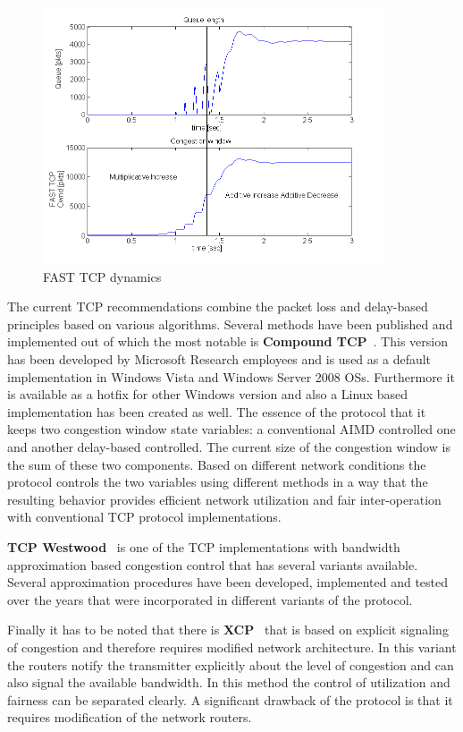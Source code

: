 \documentclass[a4paper]{article}
\begin{document}
\begin{figure}[H]
    \centering
    \includegraphics[width=0.9\textwidth]{figures/FAST.png}
    \caption{FAST TCP dynamics}
    \label{fig:FastTCP}
\end{figure}

The current TCP recommendations combine the packet loss and delay-based principles based on various algorithms. Several methods have been published and implemented out of which the most notable is \textbf{Compound TCP}~\cite{CompundTCP}. This version has been developed by Microsoft Research employees and is used as a default implementation in Windows Vista and Windows Server 2008 OSs. Furthermore it is available as a hotfix for other Windows version and also a Linux based implementation has been created as well. The essence of the protocol that it keeps two congestion window state variables: a conventional AIMD controlled one and another delay-based controlled. The current size of the congestion window is the sum of these two components. Based on different network conditions the protocol controls the two variables using different methods in a way that the resulting behavior provides efficient network utilization and fair inter-operation with conventional TCP protocol implementations.

\textbf{TCP Westwood}~\cite{TCPWestwood} is one of the TCP implementations with bandwidth approximation based congestion control that has several variants available. Several approximation procedures have been developed, implemented and tested over the years that were incorporated in different variants of the protocol.

Finally it has to be noted that there is \textbf{XCP}~\cite{XCP} that is based on explicit signaling of congestion and therefore requires modified network architecture. In this variant the routers notify the transmitter explicitly about the level of congestion and can also signal the available bandwidth. In this method the control of utilization and fairness can be separated clearly. A significant drawback of the protocol is that it requires modification of the network routers.
\end{document}
